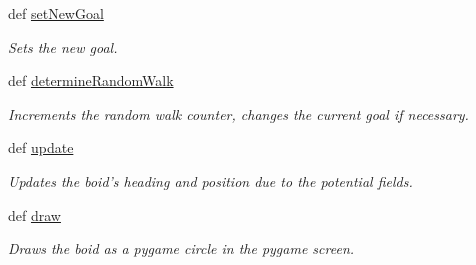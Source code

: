 \begin{DoxyCompactItemize}
def \hyperlink{classboid_1_1Boid_af2f2931c5971a4447cfe179fdafe3ab5}{set\-New\-Goal}
\begin{DoxyCompactList}\small\item\em Sets the new goal. \end{DoxyCompactList}\item 
def \hyperlink{classboid_1_1Boid_ae658dd15bb05b6addce51fba0907709b}{determine\-Random\-Walk}
\begin{DoxyCompactList}\small\item\em Increments the random walk counter, changes the current goal if necessary. \end{DoxyCompactList}\item 
def \hyperlink{classboid_1_1Boid_a8a354e4b7d58ced69771f3bb5f52d257}{update}
\begin{DoxyCompactList}\small\item\em Updates the boid's heading and position due to the potential fields. \end{DoxyCompactList}\item 
def \hyperlink{classboid_1_1Boid_a289cbbc12cc9c3e7445a5f37b2d88124}{draw}
\begin{DoxyCompactList}\small\item\em Draws the boid as a pygame circle in the pygame screen. \end{DoxyCompactList}\end{DoxyCompactItemize}
